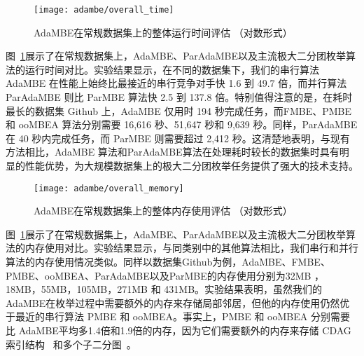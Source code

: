 


\begin{figure} [H]
	\centering
  \vspace{0.05in}
	\texttt{[image: adambe/overall\_time]}
	\caption{AdaMBE在常规数据集上的整体运行时间评估 （对数形式）}

	\label{fig:ada_overall_time}
\end{figure}




图~\ref{fig:ada_overall_time}展示了在常规数据集上，AdaMBE、ParAdaMBE以及主流极大二分团枚举算法的运行时间对比。实验结果显示，在不同的数据集下，我们的串行算法 AdaMBE 在性能上始终比最接近的串行竞争对手快 1.6 到 49.7 倍，而并行算法 ParAdaMBE 则比 ParMBE 算法快 2.5 到 137.8 倍。特别值得注意的是，在耗时最长的数据集 Github 上，AdaMBE 仅用时 194 秒完成任务，而FMBE、PMBE 和 ooMBEA 算法分别需要 16,616 秒、51,647 秒和 9,639 秒。同样，ParAdaMBE 在 40 秒内完成任务，而 ParMBE 则需要超过 2,412 秒。这清楚地表明，与现有方法相比，AdaMBE 算法和ParAdaMBE算法在处理耗时较长的数据集时具有明显的性能优势，为大规模数据集上的极大二分团枚举任务提供了强大的技术支持。

\begin{figure} [H]
	\centering
  \vspace{0.05in}
	\texttt{[image: adambe/overall\_memory]}
	\caption{AdaMBE在常规数据集上的整体内存使用评估 （对数形式）}

	\label{fig:ada_overall_memory}
\end{figure}

图~\ref{fig:ada_overall_time}展示了在常规数据集上，AdaMBE、ParAdaMBE以及主流极大二分团枚举算法的内存使用对比。实验结果显示，与同类别中的其他算法相比，我们串行和并行算法的内存使用情况类似。同样以数据集Github为例，AdaMBE、FMBE、PMBE、ooMBEA、ParAdaMBE以及ParMBE的内存使用分别为32MB ，18MB，55MB，105MB，271MB 和	431MB。实验结果表明，虽然我们的AdaMBE在枚举过程中需要额外的内存来存储局部邻居，但他的内存使用仍然优于最近的串行算法 PMBE 和 ooMBEA。事实上，PMBE 和 ooMBEA 分别需要比 AdaMBE平均多1.4倍和1.9倍的内存，因为它们需要额外的内存来存储 CDAG 索引结构~\cite{PMBE20} 和多个子二分图~\cite{ooMBE22}。


